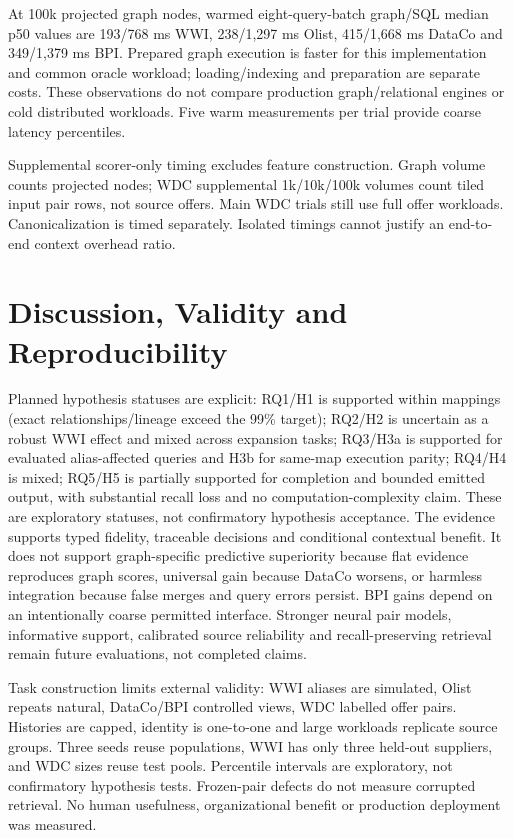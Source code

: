 \documentclass[conference,letterpaper]{IEEEtran}
\begin{document}
At 100k projected graph nodes, warmed eight-query-batch graph/SQL median p50 values are 193/768 ms WWI, 238/1,297 ms Olist, 415/1,668 ms DataCo and 349/1,379 ms BPI. Prepared graph execution is faster for this implementation and common oracle workload; loading/indexing and preparation are separate costs. These observations do not compare production graph/relational engines or cold distributed workloads. Five warm measurements per trial provide coarse latency percentiles.

Supplemental scorer-only timing excludes feature construction. Graph volume counts projected nodes; WDC supplemental 1k/10k/100k volumes count tiled input pair rows, not source offers. Main WDC trials still use full offer workloads. Canonicalization is timed separately. Isolated timings cannot justify an end-to-end context overhead ratio.

\section{Discussion, Validity and Reproducibility}
Planned hypothesis statuses are explicit: RQ1/H1 is supported within mappings (exact relationships/lineage exceed the 99\% target); RQ2/H2 is uncertain as a robust WWI effect and mixed across expansion tasks; RQ3/H3a is supported for evaluated alias-affected queries and H3b for same-map execution parity; RQ4/H4 is mixed; RQ5/H5 is partially supported for completion and bounded emitted output, with substantial recall loss and no computation-complexity claim. These are exploratory statuses, not confirmatory hypothesis acceptance.
The evidence supports typed fidelity, traceable decisions and conditional contextual benefit. It does not support graph-specific predictive superiority because flat evidence reproduces graph scores, universal gain because DataCo worsens, or harmless integration because false merges and query errors persist. BPI gains depend on an intentionally coarse permitted interface. Stronger neural pair models, informative support, calibrated source reliability and recall-preserving retrieval remain future evaluations, not completed claims.

Task construction limits external validity: WWI aliases are simulated, Olist repeats natural, DataCo/BPI controlled views, WDC labelled offer pairs. Histories are capped, identity is one-to-one and large workloads replicate source groups. Three seeds reuse populations, WWI has only three held-out suppliers, and WDC sizes reuse test pools. Percentile intervals are exploratory, not confirmatory hypothesis tests. Frozen-pair defects do not measure corrupted retrieval. No human usefulness, organizational benefit or production deployment was measured.
\end{document}
